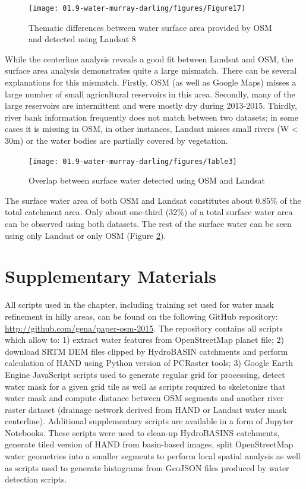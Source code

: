 \begin{figure}
	\centering
	\texttt{[image: 01.9-water-murray-darling/figures/Figure17]}
	\caption{Thematic differences between water surface area provided by OSM and detected using Landsat 8}
	\label{fig:au-positional-differences-thematic}
\end{figure}

While the centerline analysis reveals a good fit between Landsat and OSM, the surface area analysis demonstrates quite a large mismatch. There can be several explanations for this mismatch. Firstly, OSM (as well as Google Maps) misses a large number of small agricultural reservoirs in this area. Secondly, many of the large reservoirs are intermittent and were mostly dry during 2013-2015. Thirdly, river bank information frequently does not match between two datasets; in some cases it is missing in OSM, in other instances, Landsat misses small rivers (W < 30m) or the water bodies are partially covered by vegetation.

\begin{figure}
	\centering
	\texttt{[image: 01.9-water-murray-darling/figures/Table3]}
	\caption{Overlap between surface water detected using OSM and Landsat}
	\label{fig:final-overlap}
\end{figure}

The surface water area of both OSM and Landsat constitutes about 0.85\% of the total catchment area. Only about one-third (32\%) of a total surface water area can be observed using both datasets. The rest of the surface water can be seen using only Landsat or only OSM (Figure \ref{fig:final-overlap}).

\section{Supplementary Materials}
All scripts used in the chapter, including training set used for water mask refinement in hilly areas, can be found on the following GitHub repository: \url{http://github.com/gena/paper-osm-2015}. The repository contains all scripts which allow to: 1) extract water features from OpenStreetMap planet file; 2) download SRTM DEM files clipped by HydroBASIN catchments and perform calculation of HAND using Python version of PCRaster tools; 3) Google Earth Engine JavaScript scripts used to generate regular grid for processing, detect water mask for a given grid tile as well as scripts required to skeletonize that water mask and compute distance between OSM segments and another river raster dataset (drainage network derived from HAND or Landsat water mask centerline). Additional supplementary scripts are available in a form of Jupyter Notebooks. These scripts were used to clean-up HydroBASINS catchments, generate tiled version of HAND from basin-based images, split OpenStreetMap water geometries into a smaller segments to perform local spatial analysis as well as scripts used to generate histograms from GeoJSON files produced by water detection scripts.

